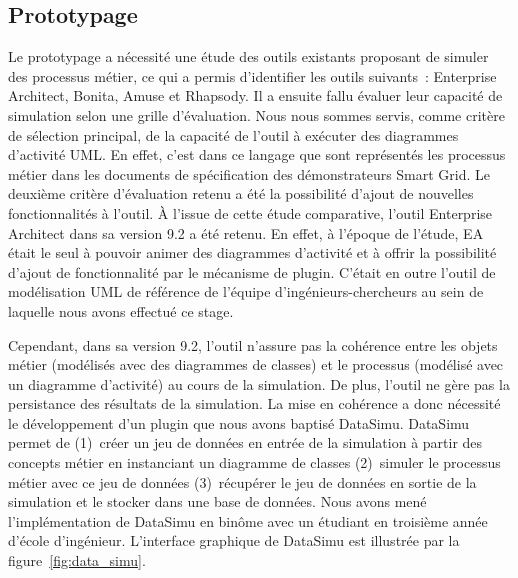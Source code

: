 \subsection{Prototypage}
Le prototypage a nécessité une étude des outils existants proposant de 
simuler des processus métier, ce qui a permis d'identifier les outils suivants~: 
Enterprise Architect, Bonita, Amuse et Rhapsody. Il a ensuite fallu évaluer leur capacité de simulation selon une grille d'évaluation.
Nous nous sommes servis, comme critère de 
sélection principal, de la capacité de l'outil à exécuter des diagrammes 
d'activité UML. En effet, c'est dans ce langage que sont représentés les 
processus métier dans les documents de spécification des démonstrateurs Smart 
Grid. Le deuxième critère d'évaluation retenu a été la possibilité d'ajout de 
nouvelles fonctionnalités à l'outil. À l'issue de cette étude comparative, 
l'outil Enterprise Architect dans sa version 9.2 a été retenu. En effet, à 
l'époque de l'étude, EA était le seul à pouvoir animer des diagrammes d'activité 
et à offrir la possibilité d'ajout de fonctionnalité par le mécanisme de plugin. 
C'était en outre l'outil de modélisation UML de référence de l'équipe 
d'ingénieurs-chercheurs au sein de laquelle nous avons effectué ce stage.
				
Cependant, dans sa version 9.2, l'outil n'assure pas la cohérence entre les 
objets métier (modélisés avec des diagrammes de classes) et le processus (modélisé 
avec un diagramme d'activité) au cours de la simulation. De plus, l'outil ne 
gère pas la persistance des résultats de la simulation. La mise en cohérence a 
donc nécessité le développement d'un plugin que nous avons baptisé DataSimu. 
DataSimu permet de (1)~créer un jeu de données en entrée de la simulation à 
partir des concepts métier en instanciant un diagramme de classes (2)~simuler le 
processus métier avec ce jeu de données (3)~récupérer le jeu de données en sortie 
de la simulation et le stocker dans une base de données. Nous avons mené 
l'implémentation de DataSimu en binôme avec un étudiant en troisième année 
d'école d'ingénieur. L'interface graphique de DataSimu est illustrée par la 
figure~\ref{fig:data_simu}.
				
